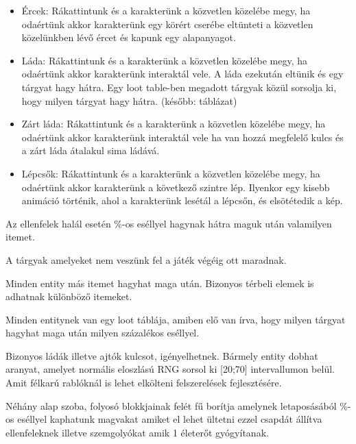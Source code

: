 \begin{itemize}

\item
Ércek: Rákattintunk és a karakterünk a közvetlen közelébe megy, ha odaértünk akkor karakterünk egy körért cserébe eltünteti a közvetlen közelünkben lévő ércet és kapunk egy alapanyagot.
\item
Láda: Rákattintunk és a karakterünk a közvetlen közelébe megy, ha odaértünk akkor karakterünk interaktál vele. A láda ezekután eltünik és egy tárgyat hagy hátra. Egy loot table-ben megadott tárgyak közül sorsolja ki, hogy milyen tárgyat hagy hátra. (később: táblázat)


\item
Zárt láda: Rákattintunk és a karakterünk a közvetlen közelébe megy, ha odaértünk akkor karakterünk interaktál vele ha van hozzá megfelelő kulcs és a zárt láda átalakul sima ládává.
\item
Lépcsők: Rákattintunk és a karakterünk a közvetlen közelébe megy, ha odaértünk akkor karakterünk a következő szintre lép. Ilyenkor egy kisebb animáció történik, ahol a karakterünk lesétál a lépcsőn, és elsötétedik a kép.

\end{itemize}


Az ellenfelek halál esetén \%-os eséllyel hagynak hátra maguk után valamilyen itemet.

A tárgyak amelyeket nem veszünk fel a játék végéig ott maradnak.

Minden entity más itemet hagyhat maga után.
Bizonyos térbeli elemek is adhatnak különböző itemeket.

Minden entitynek van egy loot táblája, amiben elő van írva, hogy milyen tárgyat hagyhat maga után milyen százalékos eséllyel.


Bizonyos ládák illetve ajtók kulcsot, igényelhetnek.
Bármely entity dobhat aranyat, amelyet normális eloszlású RNG sorsol ki [20;70] intervallumon belül. Amit félkarú rablóknál is lehet elkölteni felszerelések fejlesztésére.


Néhány alap szoba, folyosó blokkjainak felét fű borítja amelynek letaposásából \%-os eséllyel kaphatunk magvakat amiket el lehet ültetni ezzel csapdát állítva ellenfeleknek illetve szemgolyókat amik 1 életerőt gyógyítanak.

